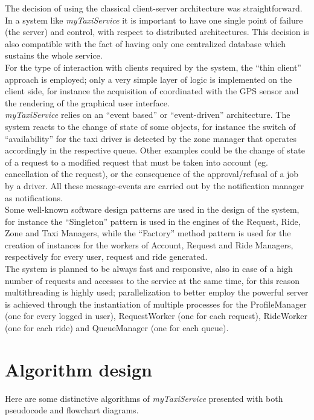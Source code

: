 \documentclass[a4paper,11pt]{report} %
\newcommand{\mts}{\mbox{\normalfont\itshape myTaxiService}}
\begin{document}
	The decision of using the classical client-server architecture was straightforward. In a system like \mts{} it is important to have one single point of failure (the server) and control, with respect to distributed architectures. This decision is also compatible with the fact of having only one centralized database which sustains the whole service.\\
	For the type of interaction with clients required by the system, the ``thin client'' approach is employed; only a very simple layer of logic is implemented on the client side, for instance the acquisition of coordinated with the GPS sensor and the rendering of the graphical user interface.\\
	\mts{} relies on an ``event based'' or ``event-driven'' architecture. The system reacts to the change of state of some objects, for instance the switch of ``availability'' for the taxi driver is detected by the zone manager that operates accordingly in the respective queue. Other examples could be the change of state of a request to a modified request that must be taken into account (eg. cancellation of the request), or the consequence of the approval/refusal of a job by a driver. All these message-events are carried out by the notification manager as notifications.\\
	Some well-known software design patterns are used in the design of the system, for instance the ``Singleton'' pattern is used in the engines of the Request, Ride, Zone and Taxi Managers, while the ``Factory'' method pattern is used for the creation of instances for the workers of Account, Request and Ride Managers, respectively for every user, request and ride generated.\\
	The system is planned to be always fast and responsive, also in case of a high number of requests and accesses to the service at the same time, for this reason multithreading is highly used; parallelization to better employ the powerful server is achieved through the instantiation of multiple processes for the ProfileManager (one for every logged in user), RequestWorker (one for each request), RideWorker (one for each ride) and QueueManager (one for each queue). 
		

	\section{Algorithm design}
	Here are some distinctive algorithms of \mts{} presented with both pseudocode and flowchart diagrams.
\end{document}
